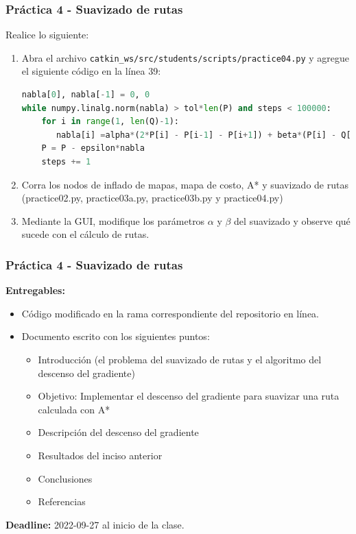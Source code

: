 \documentclass[10pt,spanish,aspectratio=1610]{beamer}
\begin{document}
\begin{frame}[containsverbatim]\frametitle{Práctica 4 - Suavizado de rutas}
  Realice lo siguiente:
  \begin{enumerate}
     \item Abra el archivo \texttt{catkin\_ws/src/students/scripts/practice04.py} y agregue el siguiente código en la línea 39:
  \begin{lstlisting}[language=Python,firstnumber=39]
nabla[0], nabla[-1] = 0, 0
while numpy.linalg.norm(nabla) > tol*len(P) and steps < 100000:
    for i in range(1, len(Q)-1):
       nabla[i] =alpha*(2*P[i] - P[i-1] - P[i+1]) + beta*(P[i] - Q[i])
    P = P - epsilon*nabla
    steps += 1
  \end{lstlisting}
  \item Corra los nodos de inflado de mapas, mapa de costo, A* y suavizado de rutas (practice02.py, practice03a.py, practice03b.py y practice04.py)
  \item Mediante la GUI, modifique los parámetros $\alpha$ y $\beta$ del suavizado y observe qué sucede con el cálculo de rutas.
  \end{enumerate}
\end{frame}

\begin{frame}[containsverbatim]\frametitle{Práctica 4 - Suavizado de rutas}
 \textbf{Entregables:}
  \begin{itemize}
  \item Código modificado en la rama correspondiente del repositorio en línea.
  \item Documento escrito con los siguientes puntos:
    \begin{itemize}
    \item Introducción (el problema del suavizado de rutas y el algoritmo del descenso del gradiente)
    \item Objetivo: Implementar el descenso del gradiente para suavizar una ruta calculada con A*
    \item Descripción del descenso del gradiente
    \item Resultados del inciso anterior 
    \item Conclusiones
    \item Referencias
    \end{itemize}
  \end{itemize}
  \textbf{Deadline: } 2022-09-27 al inicio de la clase. 
\end{frame}
\end{document}
